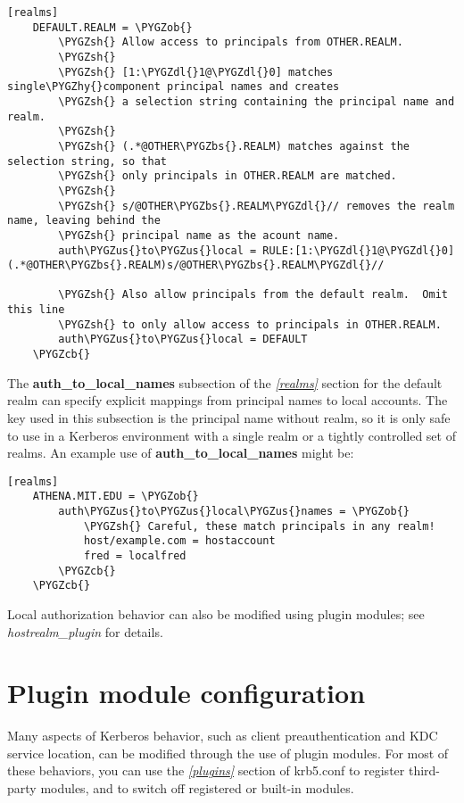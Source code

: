 \documentclass[letterpaper,10pt,english]{sphinxmanual}
\def\PYGZbs{\char`\\}
\def\PYGZus{\char`\_}
\def\PYGZob{\char`\{}
\def\PYGZcb{\char`\}}
\def\PYGZsh{\char`\#}
\def\PYGZdl{\char`\$}
\def\PYGZhy{\char`\-}
\begin{document}
\begin{Verbatim}[commandchars=\\\{\}]
[realms]
    DEFAULT.REALM = \PYGZob{}
        \PYGZsh{} Allow access to principals from OTHER.REALM.
        \PYGZsh{}
        \PYGZsh{} [1:\PYGZdl{}1@\PYGZdl{}0] matches single\PYGZhy{}component principal names and creates
        \PYGZsh{} a selection string containing the principal name and realm.
        \PYGZsh{}
        \PYGZsh{} (.*@OTHER\PYGZbs{}.REALM) matches against the selection string, so that
        \PYGZsh{} only principals in OTHER.REALM are matched.
        \PYGZsh{}
        \PYGZsh{} s/@OTHER\PYGZbs{}.REALM\PYGZdl{}// removes the realm name, leaving behind the
        \PYGZsh{} principal name as the acount name.
        auth\PYGZus{}to\PYGZus{}local = RULE:[1:\PYGZdl{}1@\PYGZdl{}0](.*@OTHER\PYGZbs{}.REALM)s/@OTHER\PYGZbs{}.REALM\PYGZdl{}//

        \PYGZsh{} Also allow principals from the default realm.  Omit this line
        \PYGZsh{} to only allow access to principals in OTHER.REALM.
        auth\PYGZus{}to\PYGZus{}local = DEFAULT
    \PYGZcb{}
\end{Verbatim}

The \textbf{auth\_to\_local\_names} subsection of the {\hyperref[admin/conf_files/krb5_conf:realms]{\emph{{[}realms{]}}}} section
for the default realm can specify explicit mappings from principal
names to local accounts.  The key used in this subsection is the
principal name without realm, so it is only safe to use in a Kerberos
environment with a single realm or a tightly controlled set of realms.
An example use of \textbf{auth\_to\_local\_names} might be:

\begin{Verbatim}[commandchars=\\\{\}]
[realms]
    ATHENA.MIT.EDU = \PYGZob{}
        auth\PYGZus{}to\PYGZus{}local\PYGZus{}names = \PYGZob{}
            \PYGZsh{} Careful, these match principals in any realm!
            host/example.com = hostaccount
            fred = localfred
        \PYGZcb{}
    \PYGZcb{}
\end{Verbatim}

Local authorization behavior can also be modified using plugin
modules; see \emph{hostrealm\_plugin} for details.


\section{Plugin module configuration}
\label{admin/host_config:plugin-config}\label{admin/host_config:plugin-module-configuration}
Many aspects of Kerberos behavior, such as client preauthentication
and KDC service location, can be modified through the use of plugin
modules.  For most of these behaviors, you can use the {\hyperref[admin/conf_files/krb5_conf:plugins]{\emph{{[}plugins{]}}}}
section of krb5.conf to register third-party modules, and to switch
off registered or built-in modules.
\end{document}

